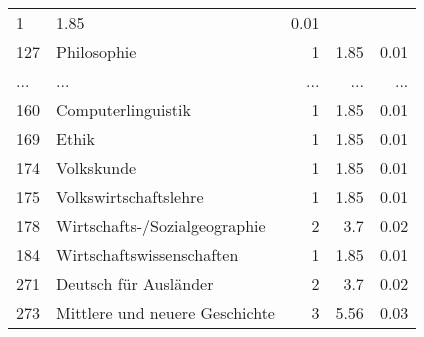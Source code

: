 \begin{longtable}{lXrrr}
          \num{1} &
          \num[round-mode=places,round-precision=2]{1.85} &
          \num[round-mode=places,round-precision=2]{0.01} \\
        127 & \multicolumn{1}{X}{Philosophie} & %
          \num{1} &
          \num[round-mode=places,round-precision=2]{1.85} &
          \num[round-mode=places,round-precision=2]{0.01} \\
       ... & ... & ... & ... & ... \\
        160 & \multicolumn{1}{X}{Computerlinguistik} & %
          \num{1} &
          \num[round-mode=places,round-precision=2]{1.85} &
          \num[round-mode=places,round-precision=2]{0.01} \\

        169 & \multicolumn{1}{X}{Ethik} & %
          \num{1} &
          \num[round-mode=places,round-precision=2]{1.85} &
          \num[round-mode=places,round-precision=2]{0.01} \\

        174 & \multicolumn{1}{X}{Volkskunde} & %
          \num{1} &
          \num[round-mode=places,round-precision=2]{1.85} &
          \num[round-mode=places,round-precision=2]{0.01} \\

        175 & \multicolumn{1}{X}{Volkswirtschaftslehre} & %
          \num{1} &
          \num[round-mode=places,round-precision=2]{1.85} &
          \num[round-mode=places,round-precision=2]{0.01} \\

        178 & \multicolumn{1}{X}{Wirtschafts-/Sozialgeographie} & %
          \num{2} &
          \num[round-mode=places,round-precision=2]{3.7} &
          \num[round-mode=places,round-precision=2]{0.02} \\

        184 & \multicolumn{1}{X}{Wirtschaftswissenschaften} & %
          \num{1} &
          \num[round-mode=places,round-precision=2]{1.85} &
          \num[round-mode=places,round-precision=2]{0.01} \\

        271 & \multicolumn{1}{X}{Deutsch für Ausländer} & %
          \num{2} &
          \num[round-mode=places,round-precision=2]{3.7} &
          \num[round-mode=places,round-precision=2]{0.02} \\

        273 & \multicolumn{1}{X}{Mittlere und neuere Geschichte} & %
          \num{3} &
          \num[round-mode=places,round-precision=2]{5.56} &
          \num[round-mode=places,round-precision=2]{0.03} \\


\end{longtable}
